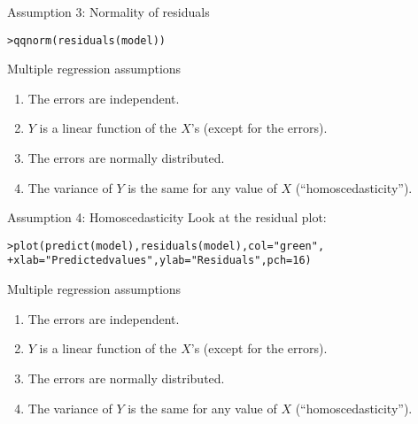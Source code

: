 \documentclass{beamer}\usepackage[]{graphicx}\usepackage[]{color}
\makeatletter
\newcommand{\hlnum}[1]{\textcolor[rgb]{0.824,0.412,0.118}{#1}}%
\newcommand{\hlstr}[1]{\textcolor[rgb]{1,0.894,0.71}{#1}}%
\newcommand{\hlstd}[1]{\textcolor[rgb]{1,0.894,0.769}{#1}}%
\newcommand{\hlkwc}[1]{\textcolor[rgb]{0.78,0.941,0.545}{#1}}%
\newcommand{\hlkwd}[1]{\textcolor[rgb]{1,0.78,0.769}{#1}}%
\newenvironment{kframe}{%
 \def\at@end@of@kframe{}%
 \ifinner\ifhmode%
  \def\at@end@of@kframe{\end{minipage}}%
  \begin{minipage}{\columnwidth}%
 \fi\fi%
 \def\FrameCommand##1{\hskip\@totalleftmargin \hskip-\fboxsep
 \colorbox{shadecolor}{##1}\hskip-\fboxsep
     \hskip-\linewidth \hskip-\@totalleftmargin \hskip\columnwidth}%
 \MakeFramed {\advance\hsize-\width
   \@totalleftmargin\z@ \linewidth\hsize
   \@setminipage}}%
 {\par\unskip\endMakeFramed%
 \at@end@of@kframe}
\newenvironment{knitrout}{}{} %
\makeatother
\begin{document}
\begin{darkframes}
    \begin{frame}[fragile]{Assumption 3: Normality of residuals}
\begin{knitrout}
\begin{kframe}
\begin{alltt}
\hlstd{> }\hlkwd{qqnorm}\hlstd{(}\hlkwd{residuals}\hlstd{(model))}
\end{alltt}
\end{kframe}


\end{knitrout}
    \end{frame}

    \begin{frame}{Multiple regression assumptions}
      \begin{enumerate}
        \item The errors are independent. \greencheckmark
        \item $Y$ is a linear function of the $X$'s (except for the errors). \greencheckmark
        \item The errors are normally distributed. \greencheckmark
        \item The variance of $Y$ is the same for any value of $X$ (``homoscedasticity'').
      \end{enumerate}
    \end{frame}

    \begin{frame}[fragile]{Assumption 4: Homoscedasticity}
      Look at the residual plot:
      \fontsm
\begin{knitrout}
\begin{kframe}
\begin{alltt}
\hlstd{> }\hlkwd{plot}\hlstd{(}\hlkwd{predict}\hlstd{(model),} \hlkwd{residuals}\hlstd{(model),} \hlkwc{col}\hlstd{=}\hlstr{"green"}\hlstd{,}
\hlstd{+ }  \hlkwc{xlab}\hlstd{=}\hlstr{"Predicted values"}\hlstd{,} \hlkwc{ylab}\hlstd{=}\hlstr{"Residuals"}\hlstd{,} \hlkwc{pch}\hlstd{=}\hlnum{16}\hlstd{)}
\end{alltt}
\end{kframe}


\end{knitrout}
    \end{frame}

    \begin{frame}{Multiple regression assumptions}
      \begin{enumerate}
        \item The errors are independent. \greencheckmark
        \item $Y$ is a linear function of the $X$'s (except for the errors). \greencheckmark
        \item The errors are normally distributed. \greencheckmark
        \item The variance of $Y$ is the same for any value of $X$ (``homoscedasticity''). \shrug[red]
      \end{enumerate}
    \end{frame}


\end{darkframes}
\end{document}

